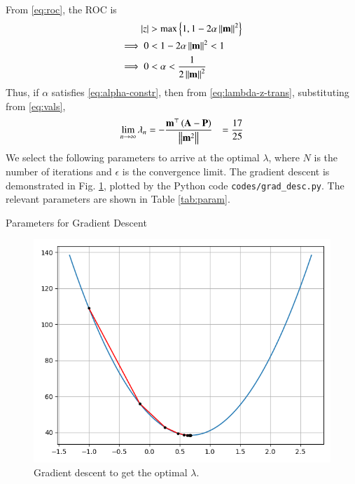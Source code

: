 \documentclass[journal,12pt,twocolumn]{IEEEtran}
\begin{document}
\begin{enumerate}
\begin{align}
        \label{eq:lambda-z-trans}
    \end{align}
    From \eqref{eq:roc}, the ROC is
    \begin{align}
        \left\vert z\right\vert &> \max\left\{1,1-2\alpha\left\lVert\mathbf{m}\right\rVert^2\right\} \\
        \implies 0 &< 1 - 2\alpha\left\lVert\mathbf{m}\right\rVert^2 < 1 \\
        \implies 0 &< \alpha < \frac{1}{2\left\lVert\mathbf{m}\right\rVert^2}
        \label{eq:alpha-constr}
    \end{align}
    Thus, if $\alpha$ satisfies \eqref{eq:alpha-constr}, then from 
    \eqref{eq:lambda-z-trans}, substituting from \eqref{eq:vals},
    \begin{align}
        \lim_{n\to\infty}\lambda_n &= -\frac{\mathbf{m}^\top\left(\mathbf{A}-\mathbf{P}\right)}{\left\lVert\mathbf{m}^2\right\rVert}                                  \label{eq:conv}
                                   &= \frac{17}{25}
    \end{align}
    We select the following parameters to arrive at the optimal $\lambda$,
    where $N$ is the number of iterations and $\epsilon$ is the convergence 
    limit. The gradient descent is demonstrated in Fig. \ref{fig:grad-desc},
    plotted by the Python code \texttt{codes/grad\_desc.py}. The relevant
    parameters are shown in Table \ref{tab:param}.
    \begin{table}[!ht]
        \centering
        
        \caption{Parameters for Gradient Descent}
        \label{tab:param}
    \end{table}

    \begin{figure}[!ht]
        \centering
        \includegraphics[width=\columnwidth]{figs/grad_desc.png}
        \caption{Gradient descent to get the optimal $\lambda$.}
        \label{fig:grad-desc}
    \end{figure}
\end{enumerate}
\end{document}
